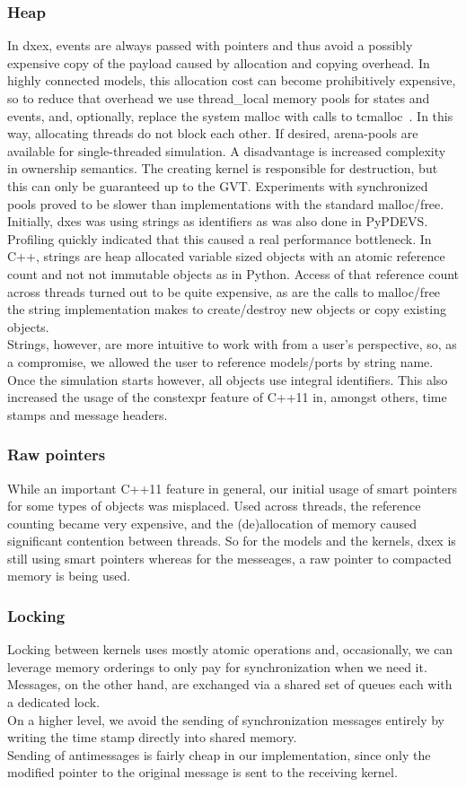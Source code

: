 \subsubsection{Heap}
In dxex, events are always passed with pointers and thus avoid a possibly expensive copy of the payload caused by allocation and copying overhead. In highly connected models, this allocation cost can become prohibitively expensive, so to reduce that overhead we use thread\_local memory pools for states and events, and, optionally, replace the system malloc with calls to tcmalloc~\cite{tcmalloc}. In this way, allocating threads do not block each other. If desired, arena-pools are available for single-threaded simulation. A disadvantage is increased complexity in ownership semantics. The creating kernel is responsible for destruction, but this can only be guaranteed up to the GVT. Experiments with synchronized pools proved to be slower than implementations with the standard malloc/free.\\
Initially, dxes was using strings as identifiers as was also done in PyPDEVS. Profiling quickly indicated that this caused a real performance bottleneck. In C++, strings are heap allocated variable sized objects with an atomic reference count and not not immutable objects as in Python. Access of that reference count across threads turned out to be quite expensive, as are the calls to malloc/free the string implementation makes to create/destroy new objects or copy existing objects.\\
Strings, however, are more intuitive to work with from a user's perspective, so, as a compromise, we allowed the user to reference models/ports by string name. Once the simulation starts however, all objects use integral identifiers. This also increased the usage of the constexpr feature of C++11 in, amongst others, time stamps and message headers.
\subsubsection{Raw pointers}
While an important C++11 feature in general, our initial usage of smart pointers for some types of objects was misplaced. Used across threads, the reference counting became very expensive, and the (de)allocation of memory caused significant contention between threads. So for the models and the kernels, dxex is still using smart pointers whereas for the messeages, a raw pointer to compacted memory is being used. 
\subsubsection{Locking}
Locking between kernels uses mostly atomic operations and, occasionally, we can leverage memory orderings to only pay for synchronization when we need it. Messages, on the other hand, are exchanged via a shared set of queues each with a dedicated lock.\\
On a higher level, we avoid the sending of synchronization messages entirely by writing the time stamp directly into shared memory.\\ Sending of antimessages is fairly cheap in our implementation, since only the modified pointer to the original message is sent to the receiving kernel.
